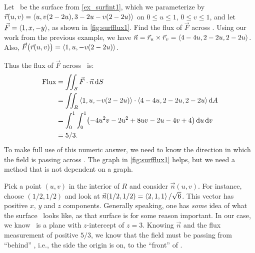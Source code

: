 \begin{example}\label{ex_surfflux1}%
Let \surfaceS\ be the surface from \autoref{ex_surfint1}, which we parameterize by $\vec r(u,v) =\left\langle u, v(2-2u),3-2u-v(2-2u)\right\rangle$ on $0\leq u\leq 1$, $0\leq v\leq 1$, and let $\vec F =\left\langle 1, x,-y\right\rangle$, as shown in \autoref{fig:surfflux1}. Find the flux of $\vec F$ across \surfaceS.
\solution
Using our work from the previous example, we have $\vec n = \vec r_u\times\vec r_v =\left\langle 4-4u,2-2u,2-2u\right\rangle$. Also, $\vec F\bigl(\vec r(u,v)\bigr) =\left\langle 1, u, -v(2-2u)\right\rangle$. 

Thus the flux of $\vec F$ across \surfaceS\ is:
\begin{align*}
	\text{Flux}
	&= \iint_{\mathcal{S}} \vec F\cdot \vec n\operatorname{d}\! S\\
	&= \iint_R\left\langle 1,u,-v(2-2u)\right\rangle\cdot\left\langle 4-4u,2-2u,2-2u\right\rangle\operatorname{d}\! A \\
	&= \int_0^1\int_0^1 \bigl(-4u^2v-2u^2+8uv-2u-4v+4\bigr)\operatorname{d}\! u\operatorname{d}\! v\\
	&= 5/3.
\end{align*}
To make full use of this numeric answer, we need to know the direction in which the field is passing across \surfaceS. The graph in \autoref{fig:surfflux1} helps, but we need a method that is not dependent on a graph.

Pick a point $(u,v)$ in the interior of $R$ and consider $\vec n(u,v)$. For instance, choose $(1/2,1/2)$ and look at $\vec n(1/2,1/2) =\left\langle 2,1,1\right\rangle/\sqrt{6}$. This vector has positive $x$, $y$ and $z$ components. Generally speaking, one has \emph{some} idea of what the surface \surfaceS\ looks like, as that surface is for some reason important. In our case, we know \surfaceS\ is a plane with $z$-intercept of $z=3$. Knowing $\vec n$ and the flux measurement of positive $5/3$, we know that the field must be passing from ``behind'' \surfaceS, i.e., the side the origin is on, to the ``front'' of \surfaceS.
\end{example}


